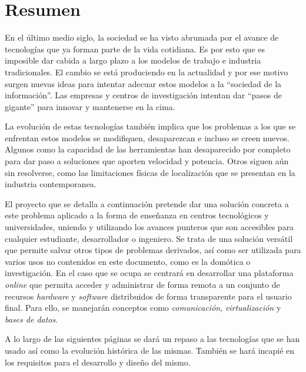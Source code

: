 
\vspace*{2cm}
\section*{Resumen}

En el último medio siglo, la sociedad se ha visto abrumada por el 
avance de tecnologías que ya forman parte de la vida cotidiana. Es por 
esto que es imposible dar cabida a largo plazo a los modelos de 
trabajo e industria tradicionales. El cambio se está produciendo en la 
actualidad y por ese motivo surgen nuevas ideas para intentar adecuar 
estos modelos a la ``sociedad de la información''. Las empresas y 
centros de investigación intentan dar ``pasos de gigante'' para 
innovar y mantenerse en la cima.

La evolución de estas tecnologías también implica que los problemas 
a los que se enfrentan estos modelos se modifiquen, desaparezcan e 
incluso se creen nuevos. Algunos como la capacidad de las herramientas 
han desaparecido por completo para dar paso a soluciones que aporten 
velocidad y potencia. Otros siguen aún sin resolverse, 
como las limitaciones físicas de localización que se presentan en la 
industria contemporanea.

El proyecto que se detalla a continuación pretende dar una solución 
concreta a este problema aplicado a la forma de enseñanza en centros 
tecnológicos y universidades, uniendo y utilizando los avances punteros 
que son accesibles para cualquier estudiante, desarrollador o 
ingeniero. Se trata de una solución versátil que permite salvar otros 
tipos de problemas derivados, así como ser utilizada para varios 
usos no contenidos en este documento, como es la domótica o 
investigación. En el caso que se ocupa se centrará en desarrollar una plataforma 
\emph{online} que permita acceder y administrar de forma remota a un 
conjunto de recursos \emph{hardware} y \emph{software} distribuidos de forma 
transparente para el usuario final. Para ello, se manejarán conceptos 
como \emph{comunicación}, \emph{virtualización} y \emph{bases de datos}.

A lo largo de las siguientes páginas se dará un repaso a las 
tecnologías que se han usado así como la evolución histórica de las 
mismas. También se hará incapié en los requisitos para el desarrollo 
y diseño del mismo.

\cleardoublepage

\vspace*{2cm}
